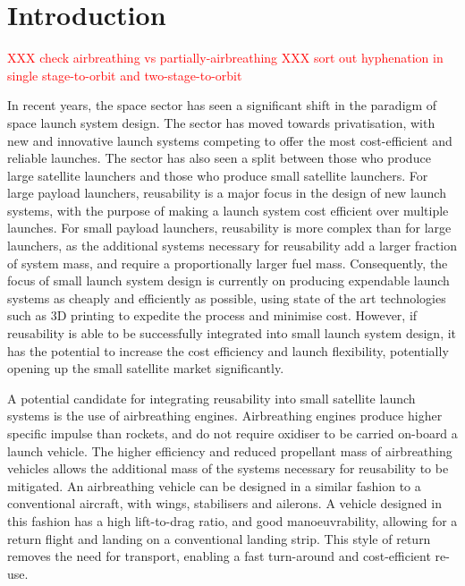 
\cleardoublepage
\chapter{Introduction}


  
  	
  	
  	\textcolor{red}{ XXX check airbreathing vs partially-airbreathing}
  	\textcolor{red}{ XXX sort out hyphenation in single stage-to-orbit and two-stage-to-orbit}
  	
  	In recent years, the space sector has seen a significant shift in the paradigm of space launch system design. 
  	The sector has moved towards privatisation, with new and innovative launch systems competing to offer the most cost-efficient and reliable launches. 
  	The sector has also seen a split between those who produce large satellite launchers and those who produce small satellite launchers.
  	For large payload launchers, reusability is a major focus in the design of new launch systems, with the purpose of making a launch system cost efficient over multiple launches\cite{Faa2018}. 
  	For small payload launchers, reusability is more complex than for large launchers, as the additional systems necessary for reusability add a larger fraction of system mass, and require a proportionally larger fuel mass. 
  	Consequently, the focus of small launch system design is currently on producing expendable launch systems as cheaply and efficiently as possible, using state of the art technologies such as 3D printing to expedite the process and minimise cost\cite{Niederstrasser2015}.
  	However, if reusability is able to be successfully integrated into small launch system design, it has the potential to increase the cost efficiency and launch flexibility, potentially opening up the small satellite market significantly. 
  	
  	
  	
  	A potential candidate for integrating reusability into small satellite launch systems is the use of airbreathing engines\cite{Smart2009a,Ketsdever2010}.
Airbreathing engines produce higher specific impulse than rockets, and do not require oxidiser to be carried on-board a launch vehicle\cite{Smart2010}.  	 
  	The higher efficiency and reduced propellant mass of airbreathing vehicles allows the additional mass of the systems necessary for reusability to be mitigated\cite{Curran2003}. An airbreathing vehicle can be designed in a similar fashion to a conventional aircraft, with wings, stabilisers and ailerons\cite{Shaughnessy1990,Preller2017b}. A vehicle designed in this fashion has a high lift-to-drag ratio, and good manoeuvrability, allowing for a return flight and landing on a conventional landing strip\cite{Preller2017b}. This style of return removes the need for transport, enabling a fast turn-around and cost-efficient re-use. 
  	

